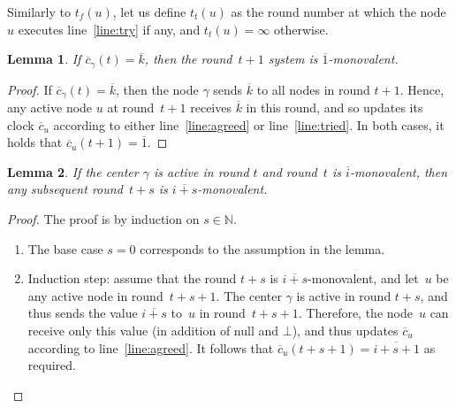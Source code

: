 \documentclass{article}
\newtheorem{lemma}{Lemma}[section]
\newcommand{\cent}{\gamma}
\newcommand{\IN}{\mathds{N}}
\newcommand{\tf}{t_{f}}
\newcommand{\try}{t_{t}}
\begin{document}
Similarly to $\tf (u)$, let us define $\try (u)$  as the round number at which the node~$u$ executes line~\ref{line:try} 
	if any, and $\try (u)= \infty$ otherwise.

\begin{lemma}\label{lem:k_mono}
If $\overline{c}_\cent(t) = \overline{k} $, then the round~$t +1$ system is $\overline{1}$-monovalent.
\end{lemma}

\begin{proof}
If $\overline{c}_\cent(t) = \overline{k} $, then the node $\cent$ sends $\overline{k}$ to all nodes in round $t+1$.
Hence, any active node $u$ at round~$t+1$ receives $\overline{k}$ in this round,
	and so updates its clock $\overline{c}_u$ according to either line~\ref{line:agreed} or line~\ref{line:tried}.
In both cases, it holds that $\overline{c}_u (t+1) =\overline{1}$.
\end{proof}

\begin{lemma}\label{lem:mono_mono}
	If the center $\cent$ is active in round $t$  and round~$t$ is $\overline{i}$-monovalent, 
	then any subsequent round~$ t + s$ is $\overline{i+ s}$-monovalent.
\end{lemma}

\begin{proof}
The proof is by induction on $s \in \IN$.
\begin{enumerate}
		\item The base case $s=0$ corresponds to the assumption in the lemma.
		\item Induction step:  assume that the round $t+s$ is $\overline{i+s}$-monovalent,
			 and let~$u$ be  any active node in round~$t+s+1$.
			The center $\cent$ is active in round $t +s$, and thus sends the value $\overline{i+s}$ to~$u$
				in round~$ t+s+1$.
			Therefore, the node~$u$ can receive only this value (in addition of null and $\bot$), and thus updates
				$\overline{c}_u$ according to line~\ref{line:agreed}. 
			It follows that $ \overline{c}_u(t+s+1) = \overline{i+s +1}$ as required.
\end{enumerate}
\end{proof}
\end{document}
